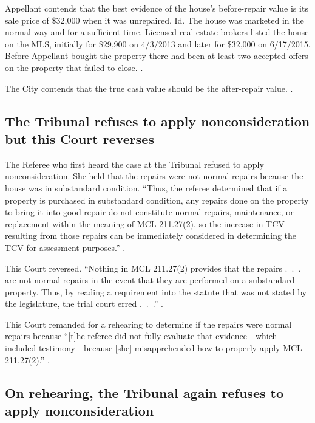 \documentclass[12pt,\documentclassflag]{michiganCourtOfAppealsBrief}
\begin{document}
Appellant contends that the best evidence of the house's before-repair value is its sale price of \$32,000 when it was unrepaired. Id. The house was marketed in the normal way and for a sufficient time. Licensed real estate brokers listed the house on the MLS, initially for \$29,900 on 4/3/2013 and later for \$32,000 on 6/17/2015. Before Appellant bought the property there had been at least two accepted offers on the property that failed to close. \mlsHistory[]. 

The City contends that the true cash value should be the after-repair value. \cityEvidence.

\subsection{The Tribunal refuses to apply nonconsideration but this Court reverses}

The Referee who first heard the case at the Tribunal refused to apply nonconsideration. She held that the repairs were not normal repairs because the house was in substandard condition. ``Thus, the referee determined that if a property is purchased in substandard condition, any repairs done on the property to bring it into good repair do not constitute normal repairs, maintenance, or replacement within the meaning of MCL 211.27(2), so the increase in TCV resulting from those repairs can be immediately considered in determining the TCV for assessment purposes.'' .

This Court reversed. ``Nothing in MCL 211.27(2) provides that the repairs .~.~. are not normal repairs in the event that they are performed on a substandard property. Thus, by reading a requirement into the statute that was not stated by the legislature, the trial court erred .~.~.'' .

This Court remanded for a rehearing to determine if the repairs were normal repairs because ``[t]he referee did not fully evaluate that evidence---which included testimony---because [she] misapprehended how to properly apply MCL 211.27(2).'' .

\subsection{On rehearing, the Tribunal again refuses to apply nonconsideration}
\end{document}

